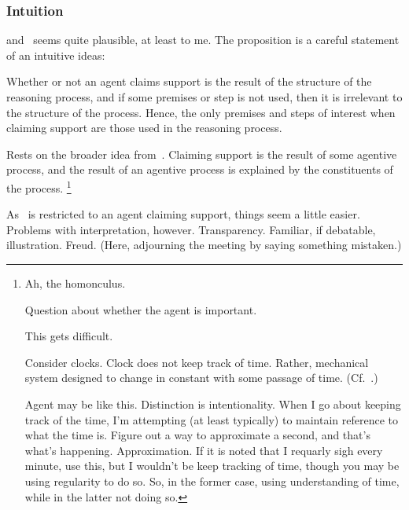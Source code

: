 \subsubsection{Intuition}

\begin{note}[Intuition]
  \ESU{} and~\gESU{} seems quite plausible, at least to me.
  The proposition is a careful statement of an intuitive ideas:

  Whether or not an agent claims support is the result of the structure of the reasoning process, and if some premises or step is not used, then it is irrelevant to the structure of the process.
  Hence, the only premises and steps of interest when claiming support are those used in the reasoning process.

  Rests on the broader idea from~\gESU{}.
  Claiming support is the result of some agentive process, and the result of an agentive process is explained by the constituents of the process.\nolinebreak
  \footnote{
    Ah, the homonculus.

    Question about whether the agent is important.

    This gets difficult.

    Consider clocks.
    Clock does not keep track of time.
    Rather, mechanical system designed to change in constant with some passage of time. (Cf.\ \textcite{Smith:1988aa}.)

    Agent may be like this.
    Distinction is intentionality.
    When I go about keeping track of the time, I'm attempting (at least typically) to maintain reference to what the time is.
    Figure out a way to approximate a second, and that's what's happening.
    Approximation.
    If it is noted that I requarly sigh every minute, use this, but I wouldn't be keep tracking of time, though you may be using regularity to do so.
    So, in the former case, using understanding of time, while in the latter not doing so.
  }

  As~\gESU{} is restricted to an agent claiming support, things seem a little easier.
  Problems with interpretation, however.
  Transparency.
  Familiar, if debatable, illustration.
  Freud.
  (Here, adjourning the meeting by saying something mistaken.)
\end{note}

